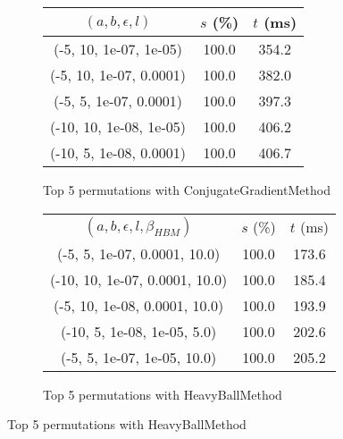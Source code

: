 \begin{figure}[H]
\begin{subfigure}[ht]{.5\textwidth}
\begin{tabular}{|c|c|c|}
\hline
\rowcolor{gray!25}
$(a,b,\epsilon,l)$ & $s$ (\%) & $t$ (ms) \\
\hline
(-5, 10, 1e-07, 1e-05) & 100.0 & 354.2 \\
(-5, 10, 1e-07, 0.0001) & 100.0 & 382.0 \\
(-5, 5, 1e-07, 0.0001) & 100.0 & 397.3 \\
(-10, 10, 1e-08, 1e-05) & 100.0 & 406.2 \\
(-10, 5, 1e-08, 0.0001) & 100.0 & 406.7 \\
\hline
\end{tabular}
\caption{Top 5 permutations with ConjugateGradientMethod}
\label{subfig:param_comp_MatrixSquareSum_ConjugateGradientMethod_DichotomousSearch}
\end{subfigure}
\hfill
\begin{subfigure}[ht]{.5\textwidth}
\begin{tabular}{|c|c|c|}
\hline
\rowcolor{gray!25}
\multicolumn{3}{|c|}{HeavyBallMethod} \\
\hline
\rowcolor{gray!25}
$(a,b,\epsilon,l,\beta_{HBM})$ & $s$ (\%) & $t$ (ms) \\
\hline
(-5, 5, 1e-07, 0.0001, 10.0) & 100.0 & 173.6 \\
(-10, 10, 1e-07, 0.0001, 10.0) & 100.0 & 185.4 \\
(-5, 10, 1e-08, 0.0001, 10.0) & 100.0 & 193.9 \\
(-10, 5, 1e-08, 1e-05, 5.0) & 100.0 & 202.6 \\
(-5, 5, 1e-07, 1e-05, 10.0) & 100.0 & 205.2 \\
\hline
\end{tabular}
\caption{Top 5 permutations with HeavyBallMethod}
\label{subfig:param_comp_MatrixSquareSum_HeavyBallMethod_DichotomousSearch}
\end{subfigure}
\end{figure}

